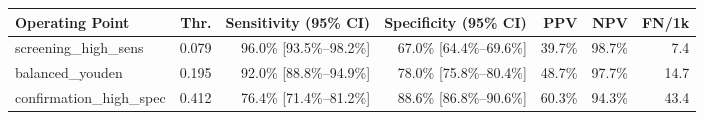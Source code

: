 \begin{tabular}{lrrrrrr}
\toprule
\textbf{Operating Point} & \textbf{Thr.} & \textbf{Sensitivity (95\% CI)} & \textbf{Specificity (95\% CI)} & \textbf{PPV} & \textbf{NPV} & \textbf{FN/1k} \\
\midrule
screening\_high\_sens & 0.079 & 96.0\% [93.5\%--98.2\%] & 67.0\% [64.4\%--69.6\%] & 39.7\% & 98.7\% & 7.4 \\
balanced\_youden & 0.195 & 92.0\% [88.8\%--94.9\%] & 78.0\% [75.8\%--80.4\%] & 48.7\% & 97.7\% & 14.7 \\
confirmation\_high\_spec & 0.412 & 76.4\% [71.4\%--81.2\%] & 88.6\% [86.8\%--90.6\%] & 60.3\% & 94.3\% & 43.4 \\
\bottomrule
\end{tabular}
